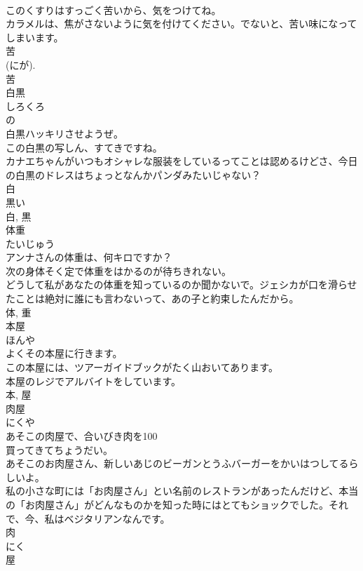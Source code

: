 \documentclass[8pt]{extreport}
\begin{document}
\begin{CJK}{UTF8}{min}
\\	このくすりはすっごく苦いから、気をつけてね。	
\\	カラメルは、焦がさないように気を付けてください。でないと、苦い味になってしまいます。	
\\	苦 
\\	(にが). 
\\	苦	
\\	白黒	
\\	しろくろ	
\\	の 
\\	白黒ハッキリさせようぜ。	
\\	この白黒の写しん、すてきですね。	
\\	カナエちゃんがいつもオシャレな服装をしているってことは認めるけどさ、今日の白黒のドレスはちょっとなんかパンダみたいじゃない？	
\\	白 
\\	黒い 
\\	白, 黒	
\\	体重	
\\	たいじゅう	
\\	アンナさんの体重は、何キロですか？	
\\	次の身体そく定で体重をはかるのが待ちきれない。	
\\	どうして私があなたの体重を知っているのか聞かないで。ジェシカが口を滑らせたことは絶対に誰にも言わないって、あの子と約束したんだから。	
\\	体, 重	
\\	本屋	
\\	ほんや	
\\	よくその本屋に行きます。	
\\	この本屋には、ツアーガイドブックがたく山おいてあります。	
\\	本屋のレジでアルバイトをしています。	
\\	本, 屋	
\\	肉屋	
\\	にくや	
\\	あそこの肉屋で、合いびき肉を100
\\	買ってきてちょうだい。	
\\	あそこのお肉屋さん、新しいあじのビーガンとうふバーガーをかいはつしてるらしいよ。	
\\	私の小さな町には「お肉屋さん」とい名前のレストランがあったんだけど、本当の「お肉屋さん」がどんなものかを知った時にはとてもショックでした。それで、今、私はベジタリアンなんです。	
\\	肉 
\\	にく 
\\	屋 

\end{CJK}
\end{document}
